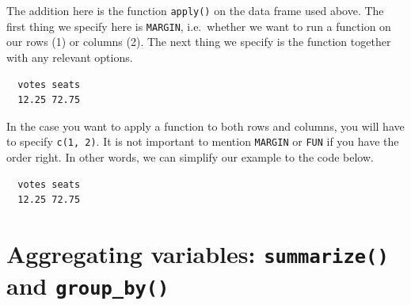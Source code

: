 \documentclass[12pt,oneside]{reedthesis}
\theoremstyle{definition}
\theoremstyle{definition}
\theoremstyle{definition}
\theoremstyle{remark}
\begin{document}
  The addition here is the function \texttt{apply()} on the data frame
  used above. The first thing we specify here is \texttt{MARGIN},
  i.e.~whether we want to run a function on our rows (1) or columns (2).
  The next thing we specify is the function together with any relevant
  options.
  \begin{Shaded}
  \end{Shaded}
  \begin{verbatim}
  votes seats 
  12.25 72.75 
  \end{verbatim}
  In the case you want to apply a function to both rows and columns, you
  will have to specify \texttt{c(1,\ 2)}. It is not important to mention
  \texttt{MARGIN} or \texttt{FUN} if you have the order right. In other
  words, we can simplify our example to the code below.
  \begin{Shaded}
  \end{Shaded}
  \begin{verbatim}
  votes seats 
  12.25 72.75 
  \end{verbatim}
  \section{\texorpdfstring{Aggregating variables: \texttt{summarize()} and
  \texttt{group\_by()}}{Aggregating variables: summarize() and group\_by()}}\label{aggregating-variables-summarize-and-group_by}
  
\end{document}

